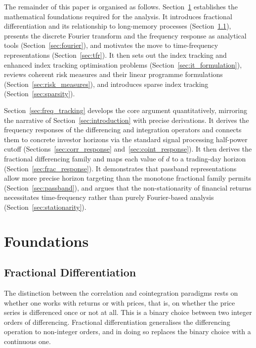 \documentclass[12pt,a4paper]{article}
\begin{document}
The remainder of this paper is organised as follows.
Section~\ref{sec:foundations} establishes the mathematical foundations
required for the analysis. It introduces fractional differentiation and
its relationship to long-memory processes
(Section~\ref{sec:fractional_integration}), presents the discrete
Fourier transform and the frequency response as analytical tools
(Section~\ref{sec:fourier}), and motivates the move to time-frequency
representations (Section~\ref{sec:tfr}). It then sets out the index
tracking and enhanced index tracking optimisation problems
(Section~\ref{sec:it_formulation}), reviews coherent risk measures and
their linear programme formulations (Section~\ref{sec:risk_measures}),
and introduces sparse index tracking (Section~\ref{sec:sparsity}).

Section~\ref{sec:freq_tracking} develops the core argument
quantitatively, mirroring the narrative of Section~\ref{sec:introduction}
with precise derivations. It derives the frequency responses of the
differencing and integration operators and connects them to concrete
investor horizons via the standard signal processing half-power cutoff
(Sections~\ref{sec:corr_response} and~\ref{sec:coint_response}). It
then derives the fractional differencing family and maps each value of
$d$ to a trading-day horizon (Section~\ref{sec:frac_response}). It
demonstrates that passband representations allow more precise horizon
targeting than the monotone fractional family permits
(Section~\ref{sec:passband}), and argues that the non-stationarity of
financial returns necessitates time-frequency rather than purely
Fourier-based analysis (Section~\ref{sec:stationarity}).

\section{Foundations}
\label{sec:foundations}

\subsection{Fractional Differentiation}
\label{sec:fractional_integration}

The distinction between the correlation and cointegration paradigms rests
on whether one works with returns or with prices, that is, on whether the
price series is differenced once or not at all. This is a binary choice
between two integer orders of differencing. Fractional differentiation
generalises the differencing operation to non-integer orders, and in
doing so replaces the binary choice with a continuous one.
\end{document}

